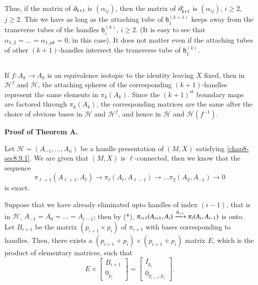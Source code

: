 Thus, if the matrix of $\partial_{k+1}$ is $(\alpha_{ij})$, then the matrix of $\partial'_{k+1}$ is $(\alpha_{ij})$, $i\geq 2$, $j\geq 2$. This we have as long as the attaching tube of $\mathfrak{h}^{(k+1)}_{1}$ keeps away from the transverse tubes of the handles $\mathfrak{h}^{(k)}_{i}$, $i\geq 2$. (It is easy to see that $\alpha_{1,2}=\ldots=\alpha_{1,pk}=0$, in this case). It does not matter even if the attaching tubes of other $(k+1)$-handles intersect the transverse tube of $\mathfrak{h}^{(k)}_{1}$.

\subsection{}\label{chap8-sec8.10.2}
If $f:A_{k}\to A_{k}$ is an equivalence isotopic to the identity leaving $X$ fixed, then in $\mathscr{H}^{f}$ and $\mathscr{H}$, the attaching spheres of the corresponding $(k+1)$-handles represent the same elements in $\pi_{k}(A_{k})$. Since the $(k+1)^{\text{st}}$ boundary maps are factored through $\pi_{k}(A_{k})$, the corresponding matrices are the same after the choice of obvious bases in $\mathscr{H}$ and $\mathscr{H}^{f}$, and hence in $\mathscr{H}$ and $\mathscr{H}(f^{-1})$. 

\medskip
\noindent
{\bf Proof of Theorem A.}
\setcounter{step}{0}
\begin{step}%
Let $\mathscr{H}=(A_{-1},\ldots,A_{n})$ be a handle presentation of $(M,X)$ satisfying \ref{chap8-sec8.9.1}. We are given that $(M,X)$ is $\ell$-connected, then we know that the sequence
\begin{equation*}
\pi_{\ell+1}(A_{\ell+1},A_{\ell})\to \pi_{\ell}(A_{\ell},A_{\ell-1})\to\ldots \pi_{2}(A_{2},A_{-1})\to 0
\end{equation*}\pageoriginale
is exact.
\end{step}

Suppose that we have already eliminated upto handles of index $(i-1)$, that is in $\mathscr{H}$, $A_{-1}=A_{0}=\ldots=A_{i-1}$; then by (*), $\pi_{i+1}(A_{i+1},A_{i})\xrightarrow{\partial_{i+1}}\pi_{i}(A_{i},A_{i-1})$ is onto. Let $B_{i+1}$ be the matrix $(p_{i+1}\times p_{i})$ of $\pi_{i+1}$ with bases corresponding to handles. Then, there exists a $(p_{i+1}+p_{i})\times(p_{i+1}+p_{i})$ matrix $E$, which is the product of elementary matrices, such that
\begin{equation*}
E\times 
\begin{bmatrix}
B_{i+1}\\
0_{p_{i}}
\end{bmatrix}
=
\begin{bmatrix}
I_{p_{i}}\\
0_{p_{i+1},p_{i}}
\end{bmatrix}.
\end{equation*}

